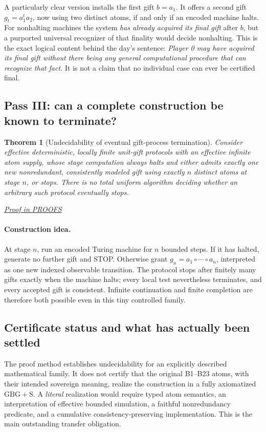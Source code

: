 \documentclass[11pt,letterpaper]{article}
\newtheorem{theorem}{Theorem}[section]
\theoremstyle{definition}\newtheorem{definition}[theorem]{Definition}\newtheorem{example}[theorem]{Example}
\theoremstyle{remark}\newtheorem{remark}[theorem]{Remark}
\newcommand{\proofat}[1]{\par\smallskip\noindent\hfill\textit{\hyperref[#1]{Proof in PROOFS}}}
\begin{document}
A particularly clear version installs the first gift $b=a_1$. It offers a second gift $g_t=a_1^t a_2$, now using two distinct atoms, if and only if an encoded machine halts. For nonhalting machines the system \emph{has already acquired its final gift} after $b$, but a purported universal recognizer of that finality would decide nonhalting. This is the exact logical content behind the day's sentence: \emph{Player 0 may have acquired its final gift without there being any general computational procedure that can recognize that fact.} It is not a claim that no individual case can ever be certified final.

\subsection{Pass III: can a complete construction be known to terminate?}
\begin{theorem}[Undecidability of eventual gift-process termination]\label{w0:thm:stop}
Consider effective deterministic, locally finite unit-gift protocols with an effective infinite atom supply, whose stage computation always halts and either admits exactly one new nonredundant, consistently modeled gift using exactly $n$ distinct atoms at stage $n$, or stops. There is no total uniform algorithm deciding whether an arbitrary such protocol eventually stops.\proofat{w0:pr:stop}
\end{theorem}

\paragraph{Construction idea.} At stage $n$, run an encoded Turing machine for $n$ bounded steps. If it has halted, generate no further gift and STOP. Otherwise grant $g_n=a_1\circ\cdots\circ a_n$, interpreted as one new indexed observable transition. The protocol stops after finitely many gifts exactly when the machine halts; every local test nevertheless terminates, and every accepted gift is consistent. Infinite continuation and finite completion are therefore both possible even in this tiny controlled family.

\subsection{Certificate status and what has actually been settled}
The proof method establishes undecidability for an explicitly described mathematical family. It does not certify that the original B1--B23 atoms, with their intended sovereign meaning, realize the construction in a fully axiomatized $\mathrm{GBG+S}$. A \emph{literal} realization would require typed atom semantics, an interpretation of effective bounded simulation, a faithful nonredundancy predicate, and a cumulative consistency-preserving implementation. This is the main outstanding transfer obligation.
\end{document}
